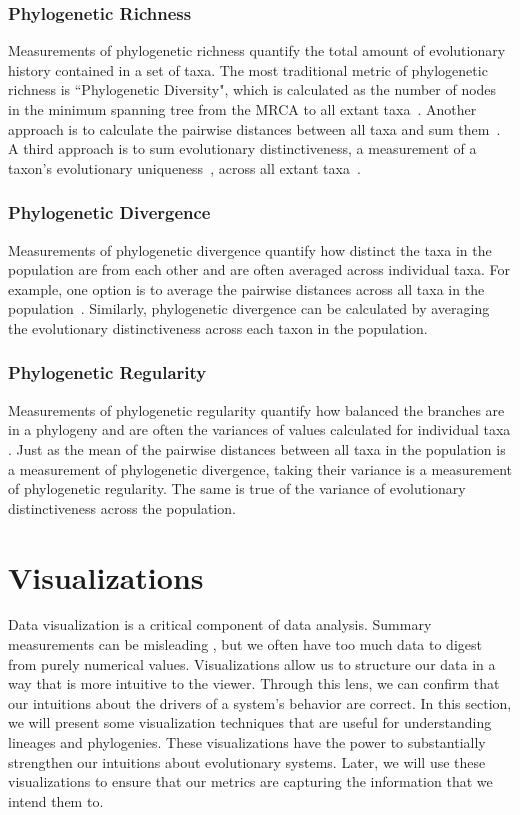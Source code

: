 \documentclass[letterpaper]{article}
\begin{document}
\subsubsection{Phylogenetic Richness}

Measurements of phylogenetic richness quantify the total amount of evolutionary history contained in a set of taxa. The most traditional metric of phylogenetic richness is ``Phylogenetic Diversity", which is calculated as the number of nodes in the minimum spanning tree from the MRCA to all extant taxa~\citep{faith_conservation_1992}. Another approach is to calculate the pairwise distances between all taxa and sum them~\citep{tucker_guide_2017}. A third approach is to sum evolutionary distinctiveness, a measurement of a taxon's evolutionary uniqueness~\citep{isaac_mammals_2007}, across all extant taxa~\citep{tucker_guide_2017}.

\subsubsection{Phylogenetic Divergence}

Measurements of phylogenetic divergence quantify how distinct the taxa in the population are from each other and are often averaged across individual taxa. For example, one option is to average the pairwise distances across all taxa in the population~\citep{webb_exploring_2000}. Similarly, phylogenetic divergence can be calculated by averaging the evolutionary distinctiveness across each taxon in the population.

\subsubsection{Phylogenetic Regularity}

Measurements of phylogenetic regularity quantify how balanced the branches are in a phylogeny and are often the variances of values calculated for individual taxa \citep{tucker_guide_2017}. Just as the mean of the pairwise distances between all taxa in the population is a measurement of phylogenetic divergence, taking their variance is a measurement of phylogenetic regularity. The same is true of the variance of evolutionary distinctiveness across the population.

\section{Visualizations}

Data visualization is a critical component of data analysis. Summary measurements can be misleading \citep{anscombe_graphs_1973}, but we often have too much data to digest from purely numerical values. Visualizations allow us to  structure our data in a way that is more intuitive to the viewer. Through this lens, we can confirm that our intuitions about the drivers of a system's behavior are correct. In this section, we will present some visualization techniques that are useful for understanding lineages and phylogenies. These visualizations have the power to substantially strengthen our intuitions about evolutionary systems. Later, we will use these visualizations to ensure that our metrics are capturing the information that we intend them to. 
\end{document}
